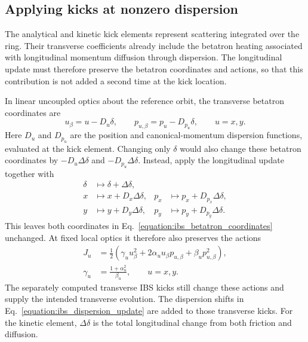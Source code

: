 \subsection{Applying kicks at nonzero dispersion}
\label{subsection:ibs_dispersive_kicks}

The analytical and kinetic kick elements represent scattering integrated
over the ring. Their transverse coefficients already include the betatron
heating associated with longitudinal momentum diffusion through dispersion.
The longitudinal update must therefore preserve the betatron coordinates
and actions, so that this contribution is not added a second time at the
kick location.

In linear uncoupled optics about the reference orbit, the transverse
betatron coordinates are
\begin{equation}
    u_\beta = u - D_u\delta, \qquad
    p_{u,\beta} = p_u - D_{p_u}\delta, \qquad u=x,y.
    \label{equation:ibs_betatron_coordinates}
\end{equation}
Here \(D_u\) and \(D_{p_u}\) are the position and canonical-momentum
dispersion functions, evaluated at the kick element. Changing only
\(\delta\) would also change these betatron coordinates by
\(-D_u\Delta\delta\) and \(-D_{p_u}\Delta\delta\).
Instead, apply the longitudinal update together with
\begin{equation}
    \begin{aligned}
        \delta &\longmapsto \delta + \Delta\delta, \\
        x &\longmapsto x + D_x\Delta\delta,
        &p_x &\longmapsto p_x + D_{p_x}\Delta\delta, \\
        y &\longmapsto y + D_y\Delta\delta,
        &p_y &\longmapsto p_y + D_{p_y}\Delta\delta.
    \end{aligned}
    \label{equation:ibs_dispersion_update}
\end{equation}
This leaves both coordinates in Eq.~\eqref{equation:ibs_betatron_coordinates}
unchanged. At fixed local optics it therefore also preserves the actions
\begin{equation}
    \begin{aligned}
        J_u &= \frac{1}{2}\left(
            \gamma_u u_\beta^2 + 2\alpha_u u_\beta p_{u,\beta}
            + \beta_u p_{u,\beta}^2\right), \\
        \gamma_u &= \frac{1+\alpha_u^2}{\beta_u}, \qquad u=x,y.
    \end{aligned}
\end{equation}
The separately computed transverse IBS kicks still change these actions
and supply the intended transverse evolution. The dispersion shifts in
Eq.~\eqref{equation:ibs_dispersion_update} are added to those transverse
kicks. For the kinetic element, \(\Delta\delta\) is the total longitudinal
change from both friction and diffusion.

